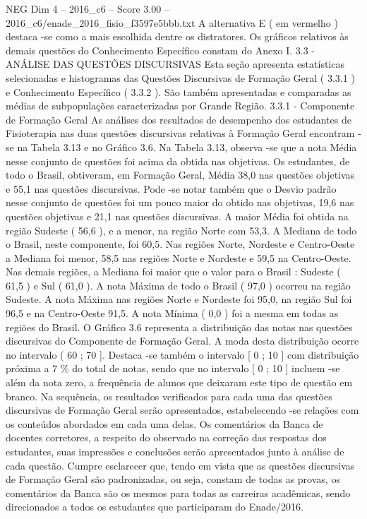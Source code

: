 \begin{textsample}{NEG Dim 4 – 2016\_c6 – Score 3.00 – 2016\_c6/enade\_2016\_fisio\_f3597e5bbb.txt}
A alternativa E ( em vermelho ) destaca -se como a mais escolhida dentre os distratores.
Os gráficos relativos às demais questões do Conhecimento Específico constam do Anexo I. 3.3 - ANÁLISE DAS QUESTÕES DISCURSIVAS Esta seção apresenta estatísticas selecionadas e histogramas das Questões Discursivas de Formação Geral ( 3.3.1 ) e Conhecimento Específico ( 3.3.2 ).
São também apresentadas e comparadas as médias de subpopulações caracterizadas por Grande Região. 3.3.1 - Componente de Formação Geral As análises dos resultados de desempenho dos estudantes de Fisioterapia nas duas questões discursivas relativas à Formação Geral encontram -se na Tabela 3.13 e no Gráfico 3.6.
Na Tabela 3.13, observa -se que a nota Média nesse conjunto de questões foi acima da obtida nas objetivas.
Os estudantes, de todo o Brasil, obtiveram, em Formação Geral, Média 38,0 nas questões objetivas e 55,1 nas questões discursivas.
Pode -se notar também que o Desvio padrão nesse conjunto de questões foi um pouco maior do obtido nas objetivas, 19,6 nas questões objetivas e 21,1 nas questões discursivas.
A maior Média foi obtida na região Sudeste ( 56,6 ), e a menor, na região Norte com 53,3.
A Mediana de todo o Brasil, neste componente, foi 60,5.
Nas regiões Norte, Nordeste e Centro-Oeste a Mediana foi menor, 58,5 nas regiões Norte e Nordeste e 59,5 na Centro-Oeste.
Nas demais regiões, a Mediana foi maior que o valor para o Brasil : Sudeste ( 61,5 ) e Sul ( 61,0 ).
A nota Máxima de todo o Brasil ( 97,0 ) ocorreu na região Sudeste.
A nota Máxima nas regiões Norte e Nordeste foi 95,0, na região Sul foi 96,5 e na Centro-Oeste 91,5.
A nota Mínima ( 0,0 ) foi a mesma em todas as regiões do Brasil.
O Gráfico 3.6 representa a distribuição das notas nas questões discursivas do Componente de Formação Geral.
A moda desta distribuição ocorre no intervalo ( 60 ; 70 ].
Destaca -se também o intervalo [ 0 ; 10 ] com distribuição próxima a 7 \% do total de notas, sendo que no intervalo [ 0 ; 10 ] incluem -se além da nota zero, a frequência de alunos que deixaram este tipo de questão em branco.
Na sequência, os resultados verificados para cada uma das questões discursivas de Formação Geral serão apresentados, estabelecendo -se relações com os conteúdos abordados em cada uma delas.
Os comentários da Banca de docentes corretores, a respeito do observado na correção das respostas dos estudantes, suas impressões e conclusões serão apresentados junto à análise de cada questão.
Cumpre esclarecer que, tendo em vista que as questões discursivas de Formação Geral são padronizadas, ou seja, constam de todas as provas, os comentários da Banca são os mesmos para todas as carreiras acadêmicas, sendo direcionados a todos os estudantes que participaram do Enade/2016.

\end{textsample}
